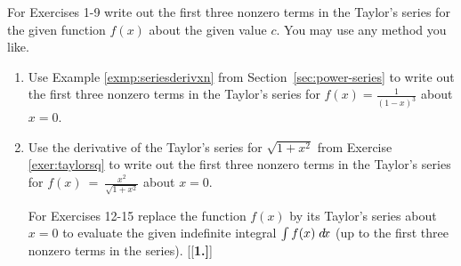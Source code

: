 \divider
\vspace{2mm}
\startexercises\label{sec9dot5}
{\small
{}
\par\noindent For Exercises 1-9 write out the first three nonzero terms in the
Taylor's series for the given function $f(x)$ about the given value $c$. You may
use any method you like.
\begin{enumerate}[\bfseries 1.]
 \item Use Example \ref{exmp:seriesderivxn} from Section~\ref{sec:power-series} to write out the
  first three nonzero terms in the Taylor's series for
  $f(x) = \frac{1}{(1 - x)^3}$ about $x=0$.
 \item Use the derivative of the Taylor's series for $\sqrt{1 + x^2}$ from
  Exercise \ref{exer:taylorsq} to write out the first three nonzero terms in the
  Taylor's series for $f(x) ~=~ \frac{x^2}{\sqrt{1 + x^2}}$ about $x=0$.
\par\noindent For Exercises 12-15 replace the function $f(x)$ by its Taylor's
 series about $x=0$ to evaluate the given indefinite integral $\int f(x) \;d\!x$
 (up to the first three nonzero terms in the series).
[{[\bfseries 1.]}]
\end{enumerate}}
